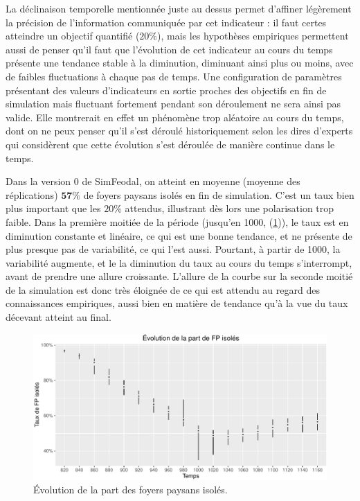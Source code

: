 La \og déclinaison temporelle\fg{} mentionnée juste au dessus permet d'affiner légèrement la précision de l'information communiquée par cet indicateur :
il faut certes atteindre un objectif quantifié ($20\%$), mais les hypothèses empiriques permettent aussi de penser qu'il faut que l'évolution de cet indicateur au cours du temps présente une tendance stable à la diminution, diminuant ainsi plus ou moins, avec de faibles fluctuations à chaque pas de temps.
Une configuration de paramètres présentant des valeurs d'indicateurs en sortie proches des objectifs en fin de simulation mais fluctuant fortement pendant son déroulement ne sera ainsi pas valide.
Elle montrerait en effet  un phénomène trop aléatoire au cours du temps, dont on ne peux penser qu'il s'est déroulé historiquement selon les dires d'experts qui considèrent que cette évolution s'est déroulée de manière continue dans le temps.

\begin{mdframed}[backgroundcolor=gray!10,footnoteinside=false]
	
	Dans la version 0 de SimFeodal, on atteint en moyenne (moyenne des réplications) $\textbf{57\%}$ de foyers paysans isolés en fin de simulation.
	C'est un taux bien plus important que les $20\%$ attendus, illustrant dès lors une polarisation trop faible.
	Dans la première moitiée de la période (jusqu'en 1000, (\cref{fig:taux-isoles-v0})), le taux est en diminution constante et linéaire, ce qui est une bonne tendance, et ne présente de plus presque pas de variabilité, ce qui l'est aussi.
	Pourtant, à partir de 1000, la variabilité augmente, et le la diminution du taux au cours du temps s'interrompt, avant de prendre une allure croissante.
	L'allure de la courbe sur la seconde moitié de la simulation est donc très éloignée de ce qui est attendu au regard des connaissances empiriques, aussi bien en matière de tendance qu'à la vue du taux décevant atteint au final.
\end{mdframed}

\begin{figure}[H]
	\captionsetup{width=\linewidth}
	\includegraphics[width=\linewidth]{img/resultats/v0_taux_FP_isoles.pdf}
	\caption{Évolution de la part des foyers paysans isolés.} 
	\label{fig:taux-isoles-v0} 
\end{figure}

